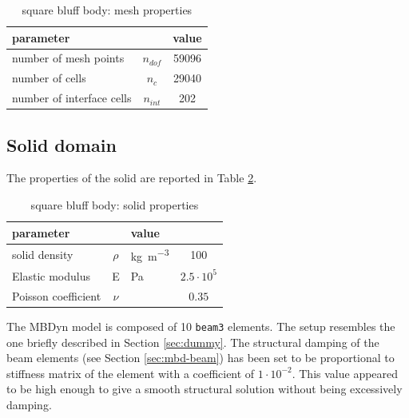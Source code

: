 \begin{table}[!htb]
	\begin{center}
		\begin{tabular}{ l c | c } 
			parameter & & value   \\ 
			\hline
			number of mesh points  & $n_{dof}$ & 59096     \\
			number of cells & $n_c$ & 29040  \\
			number of interface cells  & $n_{int}$ & 202  \\			
		\end{tabular}
	\end{center}
	\caption{square bluff body: mesh properties}
	\label{table:sq-mesh}
\end{table}


\subsection{Solid domain}

The properties of the solid are reported in Table \ref{table:sq-solid}.

\begin{table}[!htb]
	\begin{center}
		\begin{tabular}{ l c  l | c } 
			parameter & & value &    \\ 
			\hline
			solid density  & $\rho$ & \si{kg.m^{-3}} & 100    \\
			Elastic modulus  & E & \si{Pa} & $2.5\cdot 10^5$    \\
			Poisson coefficient & $\nu$ & & $0.35$  \\
		\end{tabular}
	\end{center}
	\caption{square bluff body: solid properties}
	\label{table:sq-solid}
\end{table}

The MBDyn model is composed of 10 \texttt{beam3} elements. The setup resembles the one briefly described in Section \ref{sec:dummy}. The structural damping of the beam elements (see Section \ref{sec:mbd-beam}) has been set to be proportional to stiffness matrix of the element with a coefficient of $1\cdot10^{-2}$. This value appeared to be high enough to give a smooth structural solution without being excessively damping.

